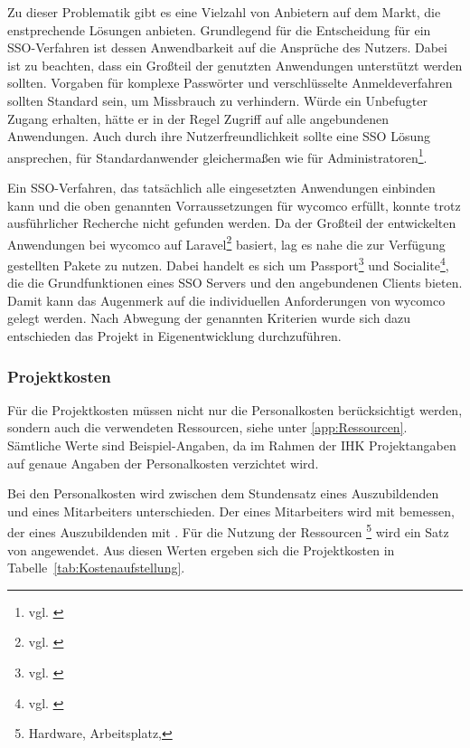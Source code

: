 Zu dieser Problematik gibt es eine Vielzahl von Anbietern auf dem Markt, die enstprechende Lösungen anbieten. 
Grundlegend für die Entscheidung für ein \ac{SSO}-Verfahren ist dessen Anwendbarkeit auf die Ansprüche des Nutzers. Dabei ist zu beachten, dass ein Großteil der genutzten Anwendungen unterstützt werden sollten. Vorgaben für komplexe Passwörter und verschlüsselte Anmeldeverfahren sollten Standard sein, um Missbrauch zu verhindern. Würde ein Unbefugter Zugang erhalten, hätte er in der Regel Zugriff auf alle angebundenen Anwendungen. Auch durch ihre Nutzerfreundlichkeit sollte eine \acs{SSO} Lösung ansprechen, für Standardanwender gleichermaßen wie für Administratoren\footnote{vgl. \cite{computerwoche}}.

Ein \ac{SSO}-Verfahren, das tatsächlich alle eingesetzten Anwendungen einbinden kann und die oben genannten Vorraussetzungen für wycomco erfüllt, konnte trotz ausführlicher Recherche nicht gefunden werden. Da der Großteil der entwickelten Anwendungen bei wycomco auf Laravel\footnote{vgl. \cite{Laravel}} basiert, lag es nahe die zur Verfügung gestellten Pakete zu nutzen. Dabei handelt es sich um Passport\footnote{vgl. \cite{Passport}} und Socialite\footnote{vgl. \cite{Socialite}}, die die Grundfunktionen eines SSO Servers und den angebundenen Clients bieten. Damit kann das Augenmerk auf die individuellen Anforderungen von wycomco gelegt werden. Nach Abwegung der genannten Kriterien wurde sich dazu entschieden das Projekt in Eigenentwicklung durchzuführen.

\subsubsection{Projektkosten}
\label{sec:Projektkosten}

Für die Projektkosten müssen nicht nur die Personalkosten berücksichtigt werden, sondern auch die verwendeten Ressourcen, siehe unter \ref{app:Ressourcen}. Sämtliche Werte sind Beispiel-Angaben, da im Rahmen der IHK Projektangaben auf genaue Angaben der Personalkosten verzichtet wird. 

Bei den Personalkosten wird zwischen dem Stundensatz eines Auszubildenden und eines Mitarbeiters unterschieden. Der eines Mitarbeiters wird mit  bemessen, der eines Auszubildenden mit .
Für die Nutzung der Ressourcen \footnote{Hardware, Arbeitsplatz, \etc} wird ein Satz von  angewendet.
Aus diesen Werten ergeben sich die Projektkosten in Tabelle~\ref{tab:Kostenaufstellung}.


